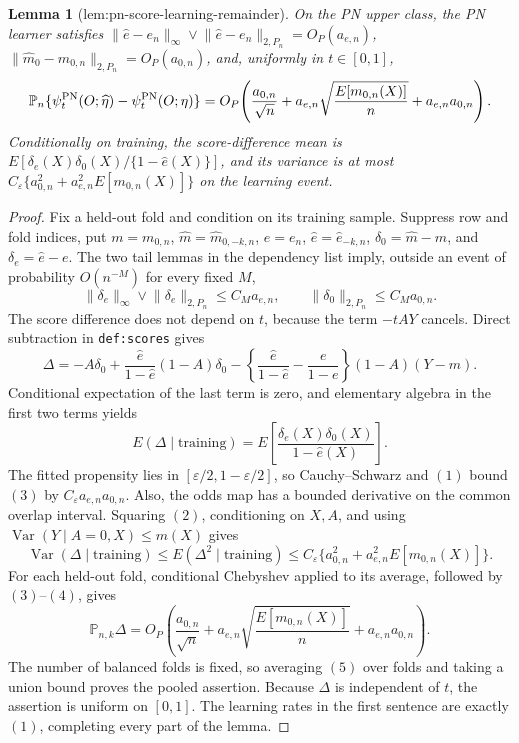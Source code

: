 \documentclass{article}
\newtheorem{lemma}{Lemma}
\begin{document}
\begin{lemma}[lem:pn-score-learning-remainder]\label{lem:pn-score-learning-remainder}
On the PN upper class, the PN learner satisfies \(\lVert\widehat e-e_n\rVert_\infty\vee\lVert\widehat e-e_n\rVert_{2,P_n}=O_P(a_{e,n})\), \(\lVert\widehat m_0-m_{0,n}\rVert_{2,P_n}=O_P(a_{0,n})\), and, uniformly in \(t\in[0,1]\),
\[
\makebox[\linewidth][c]{\resizebox{0.98\linewidth}{!}{\par\noindent \makebox[\linewidth][c]{\resizebox{0.98\linewidth}{!}{\(\displaystyle \displaystyle \mathbb P_n\{\psi_t^{\mathrm{PN}}(O;\widehat\eta)-\psi_t^{\mathrm{PN}}(O;\eta)\}=O_P\!\left(\frac{a_{0,n}}{\sqrt n}+a_{e,n}\sqrt{\frac{E[m_{0,n}(X)]}{n}}+a_{e,n}a_{0,n}\right).\)}}\par\noindent}}
\]
Conditionally on training, the score-difference mean is \(E[\delta_e(X)\delta_0(X)/\{1-\widehat e(X)\}]\), and its variance is at most \(C_\varepsilon\{a_{0,n}^2+a_{e,n}^2E[m_{0,n}(X)]\}\) on the learning event.
\end{lemma}
\begin{proof}
Fix a held-out fold and condition on its training sample. Suppress row and fold indices, put \(m=m_{0,n}\), \(\widehat m=\widehat m_{0,-k,n}\), \(e=e_n\), \(\widehat e=\widehat e_{-k,n}\), \(\delta_0=\widehat m-m\), and \(\delta_e=\widehat e-e\). The two tail lemmas in the dependency list imply, outside an event of probability \(O(n^{-M})\) for every fixed \(M\),
\[\lVert\delta_e\rVert_\infty\vee\lVert\delta_e\rVert_{2,P_n}\le C_Ma_{e,n},\qquad \lVert\delta_0\rVert_{2,P_n}\le C_Ma_{0,n}.\tag{1}\]
The score difference does not depend on \(t\), because the term \(-tAY\) cancels. Direct subtraction in \texttt{def:scores} gives
\[\Delta=-A\delta_0+\frac{\widehat e}{1-\widehat e}(1-A)\delta_0-\left\{\frac{\widehat e}{1-\widehat e}-\frac e{1-e}\right\}(1-A)(Y-m).\tag{2}\]
Conditional expectation of the last term is zero, and elementary algebra in the first two terms yields
\[E(\Delta\mid\text{training})=E\!\left[\frac{\delta_e(X)\delta_0(X)}{1-\widehat e(X)}\right].\tag{3}\]
The fitted propensity lies in \([\varepsilon/2,1-\varepsilon/2]\), so Cauchy--Schwarz and \((1)\) bound \((3)\) by \(C_\varepsilon a_{e,n}a_{0,n}\). Also, the odds map has a bounded derivative on the common overlap interval. Squaring \((2)\), conditioning on \(X,A\), and using \(\operatorname{Var}(Y\mid A=0,X)\le m(X)\) gives
\[\operatorname{Var}(\Delta\mid\text{training})\le E(\Delta^2\mid\text{training})\le C_\varepsilon\{a_{0,n}^2+a_{e,n}^2E[m_{0,n}(X)]\}.\tag{4}\]
For each held-out fold, conditional Chebyshev applied to its average, followed by \((3)\)--\((4)\), gives
\[\mathbb P_{n,k}\Delta=O_P\!\left(\frac{a_{0,n}}{\sqrt n}+a_{e,n}\sqrt{\frac{E[m_{0,n}(X)]}{n}}+a_{e,n}a_{0,n}\right).\tag{5}\]
The number of balanced folds is fixed, so averaging \((5)\) over folds and taking a union bound proves the pooled assertion. Because \(\Delta\) is independent of \(t\), the assertion is uniform on \([0,1]\). The learning rates in the first sentence are exactly \((1)\), completing every part of the lemma.
\end{proof}
\end{document}
